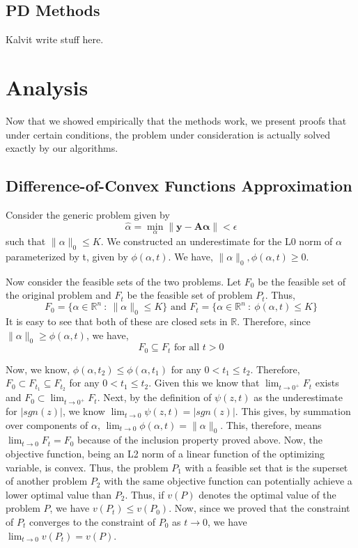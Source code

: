 \documentclass[letterpaper, 10 pt, conference]{article}
\begin{document}
\subsection{PD Methods}
{\huge Kalvit write stuff here.}

\newpage
\section{Analysis}
Now that we showed empirically that the methods work, we present proofs that under certain conditions, the problem under consideration is actually solved exactly by our algorithms.

\subsection{Difference-of-Convex Functions Approximation}
Consider the generic problem given by $$\hat{\alpha} = \min_\alpha \|\mathbf{y} - \mathbf{A \alpha}\| < \epsilon$$
such that $\|\alpha\|_0 \leq K$. We constructed an underestimate for the L0 norm of $\alpha$ parameterized by t, given by $\phi(\alpha, t)$. We have, $\|\alpha\|_0, \phi(\alpha, t) \geq 0$. 

Now consider the feasible sets of the two problems. Let $F_0$ be the feasible set of the original problem and $F_t$ be the feasible set of problem $P_t$. Thus,
$$F_0 = \{ \alpha \in \mathbb{R}^n \ :\ \|\alpha\|_0 \leq K \} \text{ and } F_t = \{ \alpha \in \mathbb{R}^n \ :\ \phi(\alpha, t) \leq K \}$$
It is easy to see that both of these are closed sets in $\mathbb{R}$. Therefore, since $\|\alpha\|_0 \geq \phi(\alpha, t)$, we have, $$F_0 \subseteq F_t \text{ for all } t>0$$

Now, we know, $\phi(\alpha, t_2) \leq \phi(\alpha, t_1)$ for any $0 < t_1 \leq t_2$. Therefore, $F_0 \subset F_{t_1} \subseteq F_{t_2}$ for any $0 < t_1 \leq t_2$. Given this we know that $\lim_{t \rightarrow 0^+} F_t$ exists and $F_0 \subset \lim_{t \rightarrow 0^+} F_t$. Next, by the definition of $\psi(z, t)$ as the underestimate for $|sgn(z)|$, we know $\lim_{t \rightarrow 0} \psi(z, t) = |sgn(z)|$. This gives, by summation over components of $\alpha$, $\lim_{t \rightarrow 0} \phi(\alpha, t) = \|\alpha\|_0$. This, therefore, means $\lim_{t \rightarrow 0} F_t = F_0$ because of the inclusion property proved above. Now, the objective function, being an L2 norm of a linear function of the optimizing variable, is convex. Thus, the problem $P_1$ with a feasible set that is the superset of another problem $P_2$ with the same objective function can potentially achieve a lower optimal value than $P_2$. Thus, if $v(P)$ denotes the optimal value of the problem $P$, we have $v(P_t) \leq v(P_0)$. Now, since we proved that the constraint of $P_t$ converges to the constraint of $P_0$ as $t \rightarrow 0$, we have $\lim_{t \rightarrow 0} v(P_t) = v(P)$.
\end{document}
